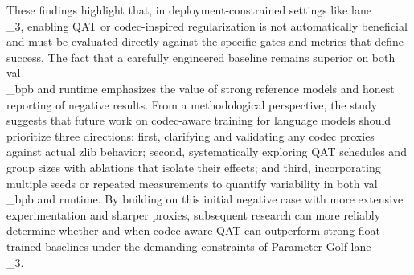 \documentclass{article}
\begin{document}
These findings highlight that, in deployment-constrained settings like lane\\_3, enabling QAT or codec-inspired regularization is not automatically beneficial and must be evaluated directly against the specific gates and metrics that define success. The fact that a carefully engineered baseline remains superior on both val\\_bpb and runtime emphasizes the value of strong reference models and honest reporting of negative results. From a methodological perspective, the study suggests that future work on codec-aware training for language models should prioritize three directions: first, clarifying and validating any codec proxies against actual zlib behavior; second, systematically exploring QAT schedules and group sizes with ablations that isolate their effects; and third, incorporating multiple seeds or repeated measurements to quantify variability in both val\\_bpb and runtime. By building on this initial negative case with more extensive experimentation and sharper proxies, subsequent research can more reliably determine whether and when codec-aware QAT can outperform strong float-trained baselines under the demanding constraints of Parameter Golf lane\\_3.



\end{document}
